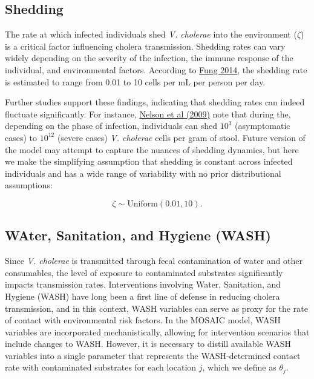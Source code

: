 \documentclass[
]{book}
\begin{document}
\subsection{Shedding}\label{shedding}

The rate at which infected individuals shed \emph{V. cholerae} into the environment (\(\zeta\)) is a critical factor influencing cholera transmission. Shedding rates can vary widely depending on the severity of the infection, the immune response of the individual, and environmental factors. According to \href{https://www.ncbi.nlm.nih.gov/pmc/articles/PMC3926264/}{Fung 2014}, the shedding rate is estimated to range from 0.01 to 10 cells per mL per person per day.

Further studies support these findings, indicating that shedding rates can indeed fluctuate significantly. For instance, \href{https://www.ncbi.nlm.nih.gov/pmc/articles/PMC3842031/}{Nelson et al (2009)} note that during the, depending on the phase of infection, individuals can shed \(10^3\) (asymptomatic cases) to \(10^{12}\) (severe cases) \emph{V. cholerae} cells per gram of stool. Future version of the model may attempt to capture the nuances of shedding dynamics, but here we make the simplifying assumption that shedding is constant across infected individuals and has a wide range of variability with no prior distributional assumptions:

\[
\zeta \sim \text{Uniform}(0.01, 10).
\]

\subsection{WAter, Sanitation, and Hygiene (WASH)}\label{water-sanitation-and-hygiene-wash}

Since \emph{V. cholerae} is transmitted through fecal contamination of water and other consumables, the level of exposure to contaminated substrates significantly impacts transmission rates. Interventions involving Water, Sanitation, and Hygiene (WASH) have long been a first line of defense in reducing cholera transmission, and in this context, WASH variables can serve as proxy for the rate of contact with environmental risk factors. In the MOSAIC model, WASH variables are incorporated mechanistically, allowing for intervention scenarios that include changes to WASH. However, it is necessary to distill available WASH variables into a single parameter that represents the WASH-determined contact rate with contaminated substrates for each location \(j\), which we define as \(\theta_j\).
\end{document}
